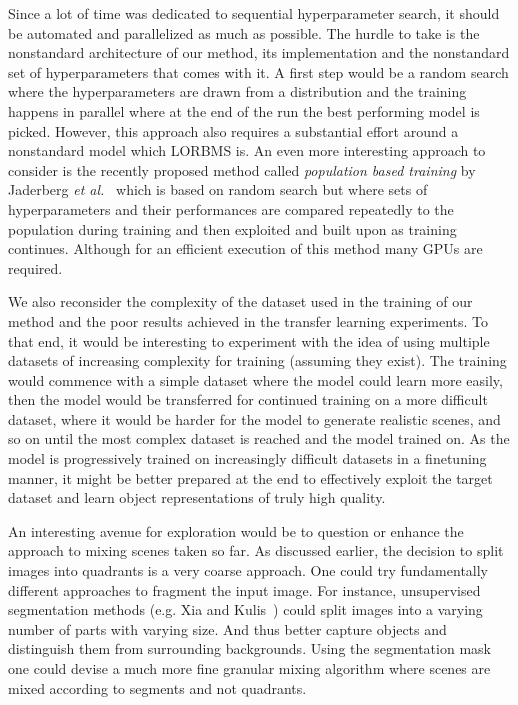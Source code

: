 \documentclass[a4paper,12pt]{report}
\begin{document}
Since a lot of time was dedicated to sequential hyperparameter search, it should be automated and parallelized as much as possible. The hurdle to take is the nonstandard architecture of our method, its implementation and the nonstandard set of hyperparameters that comes with it. A first step would be a random search where the hyperparameters are drawn from a distribution and the training happens in parallel where at the end of the run the best performing model is picked. However, this approach also requires a substantial effort around a nonstandard model which LORBMS is. An even more interesting approach to consider is the recently proposed method called \textit{population based training} by Jaderberg \textit{et al.}~\cite{PopBasedTraining} which is based on random search but where sets of hyperparameters and their performances are compared repeatedly to the population during training and then exploited and built upon as training continues. Although for an efficient execution of this method many GPUs are required. 

We also reconsider the complexity of the dataset used in the training of our method and the poor results achieved in the transfer learning experiments. To that end, it would be interesting to experiment with the idea of using multiple datasets of increasing complexity for training (assuming they exist). The training would commence with a simple dataset where the model could learn more easily, then the model would be transferred for continued training on a more difficult dataset, where it would be harder for the model to generate realistic scenes, and so on until the most complex dataset is reached and the model trained on. As the model is progressively trained on increasingly difficult datasets in a finetuning manner, it might be better prepared at the end to effectively exploit the target dataset and learn object representations of truly high quality.

An interesting avenue for exploration would be to question or enhance the approach to mixing scenes taken so far. As discussed earlier, the decision to split images into quadrants is a very coarse approach. One could try fundamentally different approaches to fragment the input image. For instance, unsupervised segmentation methods (e.g. Xia and Kulis~\cite{UnsupSegment}) could split images into a varying number of parts with varying size. And thus better capture objects and distinguish them from surrounding backgrounds. Using the segmentation mask one could devise a much more fine granular mixing algorithm where scenes are mixed according to segments and not quadrants. 
\end{document}
